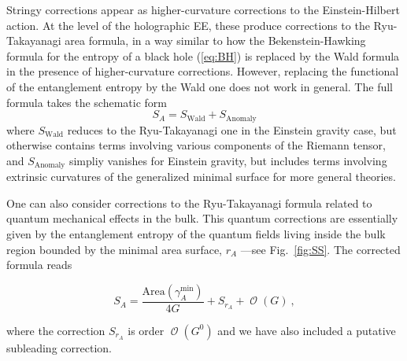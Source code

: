 \documentclass[twocolumn]{revtex4-2}
\providecommand{\eq}[2]{
    \begin{equation}
        #2
    \label{eq:#1}
    \end{equation}
}
\DeclareMathOperator{\calO}{\mathcal{O}}
\begin{document}
Stringy corrections appear as higher-curvature corrections to the Einstein-Hilbert action. At the level of the holographic EE, these produce corrections to the Ryu-Takayanagi area formula, in a way similar to 
how the Bekenstein-Hawking formula for the entropy of a black hole (\ref{eq:BH}) is replaced by the Wald formula \cite{iyer_properties_1994} in the presence of higher-curvature corrections. However, replacing the functional of the entanglement entropy by the Wald one does not work in general. The full formula takes the schematic form \cite{dong_holographic_2014}
\begin{equation}\label{hee}
    S_A=S_{\text{Wald}}+ S_{\text{Anomaly}}
\end{equation}
where $S_{\text{Wald}}$ reduces to the Ryu-Takayanagi one in the Einstein gravity case, but otherwise contains terms involving various components of the Riemann tensor, and $S_{\text{Anomaly}}$ simpliy vanishes for Einstein gravity, but includes terms involving extrinsic curvatures of the generalized minimal surface for more general theories. %



One can also consider corrections to the Ryu-Takayanagi formula related to quantum mechanical effects in the bulk. This quantum corrections are essentially given by the entanglement entropy of the quantum fields living inside the bulk region bounded by the minimal area surface, $r_A$ ---see Fig.~\ref{fig:SS}. The corrected formula reads \cite{faulkner_quantum_2013}
\eq{EEquantum}{
    S_A = \frac{\text{Area} (\gamma_A^\text{min})}{4 G} + S_{r_A} + \calO(G) \ ,
}
where the correction $S_{r_A}$ is order $\calO(G^0)$ and we have also included a putative subleading correction.
\end{document}

